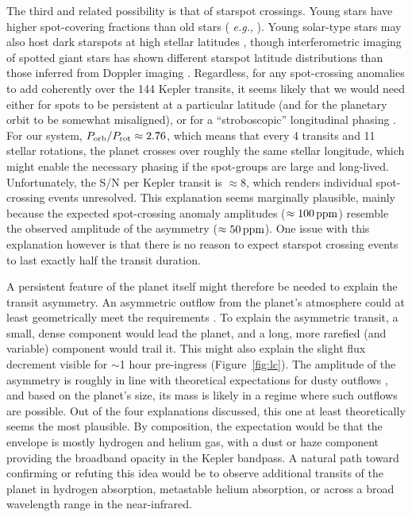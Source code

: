 \documentclass[12pt,modern,twocolumn,tighten]{aastex63}
\begin{document}
The third and related possibility is that of starspot crossings.
Young stars have higher spot-covering fractions than old stars ({\it
e.g.}, \citealt{morris_relationship_2020}).  Young solar-type stars
may also host dark starspots at high stellar latitudes \citep[{\it
e.g.}, EK~Dra;][]{strassmeier_starspots_2009}, though interferometric
imaging of spotted giant stars has shown different starspot latitude
distributions than those inferred from Doppler imaging
\citep{roettenbacher_contemporaneous_2017}.  Regardless, for any
spot-crossing anomalies to add coherently over the 144 Kepler
transits, it seems likely that we would need either for spots to be
persistent at a particular latitude (and for the planetary orbit to be
somewhat misaligned), or for a ``stroboscopic'' longitudinal phasing
\citep[{\it e.g.},][]{dai_stellar_2018}.  For our system, $P_{\rm
orb}/P_{\rm rot} \approx 2.76$, which means that every 4 transits and
11 stellar rotations, the planet crosses over roughly the same stellar
longitude, which might enable the necessary phasing if the spot-groups
are large and long-lived.  Unfortunately, the  S/N per Kepler transit
is $\approx8$, which renders individual spot-crossing events
unresolved.  This explanation seems marginally plausible, mainly because the
expected spot-crossing anomaly amplitudes ($\approx 100\,{\rm ppm}$)
resemble the observed amplitude of the asymmetry ($\approx 50\,{\rm
ppm}$).
One issue with this explanation however is that
there is no reason to expect starspot crossing events to last
exactly half the transit duration.

A persistent feature of the planet itself might therefore be needed to
explain the transit asymmetry.  An asymmetric outflow from the
planet's atmosphere could at least geometrically meet the requirements
\citep[{\it e.g.},][]{mccann_2019}.  To explain the asymmetric
transit, a small, dense component would lead the planet, and a long,
more rarefied (and variable) component would trail it.  This might
also explain the slight flux decrement visible for $\sim$1 hour
pre-ingress (Figure~\ref{fig:lc}).  The amplitude of the asymmetry is
roughly in line with theoretical expectations for dusty outflows
\citep{wang_dai_2019}, and based on the planet's size, its mass is
likely in a regime where such outflows are possible.  Out of the four
explanations discussed, this one at least theoretically seems the most plausible.
By composition, the expectation would be that the envelope is mostly
hydrogen and helium gas, with a dust or haze component providing the
broadband opacity in the Kepler bandpass.  A natural path
toward confirming or refuting this idea would be to observe additional
transits of the planet in hydrogen absorption, 
metastable helium absorption, or across a broad wavelength range in
the near-infrared.
\end{document}
